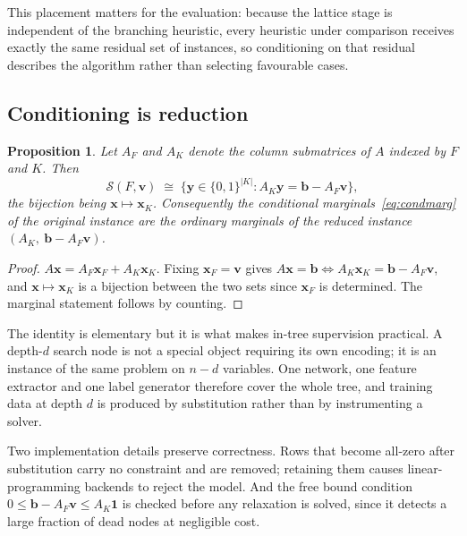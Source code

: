 \documentclass[preprint,12pt]{elsarticle}
\newtheorem{proposition}{Proposition}
\newcommand{\SOL}{\mathcal{S}}
\begin{document}
This placement matters for the evaluation: because the lattice stage is independent of the branching heuristic, every heuristic under comparison receives exactly the same residual set of instances, so conditioning on that residual describes the algorithm rather than selecting favourable cases.

\subsection{Conditioning is reduction}
\label{sec:method-reduce}

\begin{proposition}
\label{prop:reduce}
Let $A_F$ and $A_K$ denote the column submatrices of $A$ indexed by $F$ and $K$. Then
\begin{equation}
\SOL(F,\mathbf{v}) \;\cong\; \{\mathbf{y}\in\{0,1\}^{|K|} : A_K\mathbf{y} = \mathbf{b} - A_F\mathbf{v}\},
\label{eq:reduce}
\end{equation}
the bijection being $\mathbf{x}\mapsto\mathbf{x}_K$. Consequently the conditional marginals~\eqref{eq:condmarg} of the original instance are the ordinary marginals of the reduced instance $(A_K,\ \mathbf{b}-A_F\mathbf{v})$.
\end{proposition}

\begin{proof}
$A\mathbf{x} = A_F\mathbf{x}_F + A_K\mathbf{x}_K$. Fixing $\mathbf{x}_F=\mathbf{v}$ gives $A\mathbf{x}=\mathbf{b} \iff A_K\mathbf{x}_K = \mathbf{b}-A_F\mathbf{v}$, and $\mathbf{x}\mapsto\mathbf{x}_K$ is a bijection between the two sets since $\mathbf{x}_F$ is determined. The marginal statement follows by counting.
\end{proof}

The identity is elementary but it is what makes in-tree supervision practical. A depth-$d$ search node is not a special object requiring its own encoding; it is an instance of the same problem on $n-d$ variables. One network, one feature extractor and one label generator therefore cover the whole tree, and training data at depth $d$ is produced by substitution rather than by instrumenting a solver.

Two implementation details preserve correctness. Rows that become all-zero after substitution carry no constraint and are removed; retaining them causes linear-programming backends to reject the model. And the free bound condition $0\le \mathbf{b}-A_F\mathbf{v}\le A_K\mathbf{1}$ is checked before any relaxation is solved, since it detects a large fraction of dead nodes at negligible cost.
\end{document}
